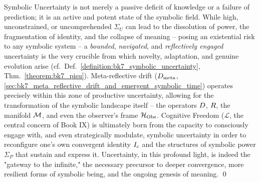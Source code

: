 \begin{scholium}
\label{scholium:bk7_uncertainty_generative_existential}
Symbolic Uncertainty is not merely a passive deficit of knowledge or a failure of prediction; it is an active and potent state of the symbolic field. While high, unconstrained, or uncomprehended \(\Sigma_U\) can lead to the dissolution of power, the fragmentation of identity, and the collapse of meaning -- posing an existential risk to any symbolic system -- a \emph{bounded}, \emph{navigated}, and \emph{reflectively engaged} uncertainty is the very crucible from which novelty, adaptation, and genuine evolution arise (cf.~Def.~\ref{definition:bk7_symbolic_uncertainty}, Thm.~\ref{theorem:bk7_pisu}). Meta-reflective drift (\(D_{\text{meta}}\), \ref{sec:bk7_meta_reflective_drift_and_emergent_symbolic_time}) operates precisely within this zone of productive uncertainty, allowing for the transformation of the symbolic landscape itself -- the operators \(D\), \(R\), the manifold \(\mathcal{M}\), and even the observer's frame \(\mathcal{H}_{\mathrm{Obs}}\). Cognitive Freedom (\(\mathcal{L}\), the central concern of Book IX) is ultimately born from the capacity to consciously engage with, and even strategically modulate, symbolic uncertainty in order to reconfigure one's own convergent identity \(I_c\) and the structures of symbolic power \(\Sigma_P\) that sustain and express it. Uncertainty, in this profound light, is indeed the "gateway to the infinite," the necessary precursor to deeper convergence, more resilient forms of symbolic being, and the ongoing genesis of meaning. \qed \end{scholium}
